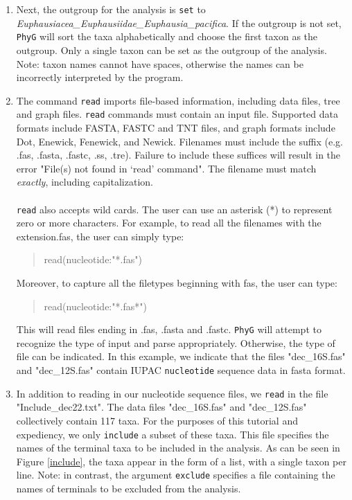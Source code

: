 \documentclass[11pt]{article}
\newcommand{\phyg}{\texttt{PhyG} }
\begin{document}
\begin{enumerate}
\item Next, the outgroup for the analysis is \texttt{set} to 
\emph{Euphausiacea\_Euphausiidae\_Euphausia\_pacifica}. If the outgroup
is not set, \phyg will sort the taxa alphabetically and choose the first taxon as the
outgroup. Only a single taxon can be set as the outgroup of the analysis. Note: taxon 
names cannot have spaces, otherwise the names can be incorrectly interpreted by
the program.

\item The command \texttt{read} imports file-based information, including data files, 
tree and graph files. \texttt{read} commands must contain an input file. Supported 
data formats include FASTA, FASTC and TNT files, and graph formats include Dot, 
Enewick, Fenewick, and Newick. Filenames must include the suffix (e.g. 
.fas, .fasta, .fastc, .ss, .tre). Failure to include these suffices will result in the error 
"File(s) not found in `read' command". The filename must match \textit{exactly}, 
including capitalization.\\
\\
\texttt{read} also accepts wild cards. The user can use an asterisk (*) to represent 
zero or more characters. For example, to read all the filenames with the extension.fas, 
the user can simply type:
        
        \begin{quote}
	read(nucleotide:"*.fas")\\
	\end{quote}
	
Moreover, to capture all the filetypes beginning with fas, the user can type: 
	
	\begin{quote}
	read(nucleotide:"*.fas*")\\
	\end{quote}

This will read files ending in .fas, .fasta and .fastc. \phyg will attempt to recognize 
the type of input and parse appropriately. Otherwise, the type of file can be 
indicated. In this example, we indicate that the files "dec\_16S.fas" and 
"dec\_12S.fas" contain IUPAC \texttt{nucleotide} sequence data in fasta format.

\item In addition to reading in our nucleotide sequence files, we \texttt{read} in the
file "Include\_dec22.txt". The data files "dec\_16S.fas" and "dec\_12S.fas" collectively 
contain 117 taxa. For the purposes of this tutorial and expediency, we only \texttt{include} 
a subset of these taxa. This file specifies the names of the terminal taxa to be included
in the analysis. As can be seen in Figure \ref{include}, the taxa appear in the form of 
a list, with a single taxon per line. Note: in contrast, the argument \texttt{exclude} 
specifies a file containing the names of terminals to be excluded from the analysis.


\end{enumerate}
\end{document}
